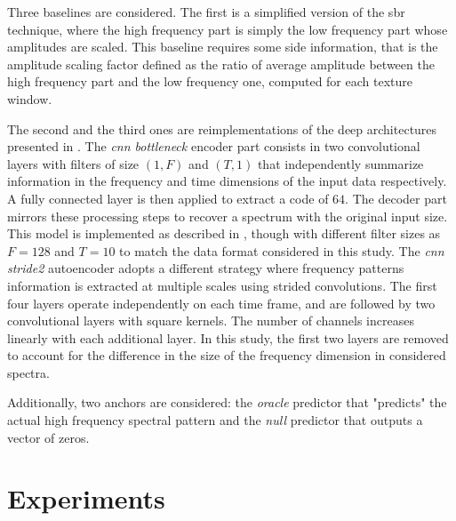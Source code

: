 \documentclass{article}
\begin{document}
Three baselines are considered. The first is a simplified version of the sbr technique, where the high frequency part is simply the low frequency part whose amplitudes are scaled. This baseline requires some side information, that is the amplitude scaling factor defined as the ratio of average amplitude between the high frequency part and the low frequency one, computed for each texture window.

The second and the third ones are reimplementations of the deep architectures presented in \cite{miron2018high}. The \textit{cnn bottleneck} encoder part consists in two convolutional layers with filters of size $(1, F)$ and $(T, 1)$ that independently summarize information in the frequency and time dimensions of the input data respectively. A fully connected layer is then applied to extract a code of $64$. The decoder part mirrors these processing steps to recover a spectrum with the original input size. This model is implemented as described in \cite{miron2018high}, though with different filter sizes as $F=128$ and $T=10$ to match the data format considered in this study. The \textit{cnn stride2} autoencoder adopts a different strategy where frequency patterns information is extracted at multiple scales using strided convolutions. The first four layers operate independently on each time frame, and are followed by two convolutional layers with square kernels. The number of channels increases linearly with each additional layer. In this study, the first two layers are removed to account for the difference in the size of the frequency dimension in considered spectra. %


Additionally, two anchors are considered: the \textit{oracle} predictor that "predicts" the actual high frequency spectral pattern and the \textit{null} predictor that outputs a vector of zeros.

\section{Experiments}
\label{sec:experiments}
\end{document}
